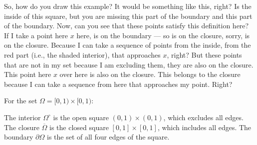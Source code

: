 \begin{spoken-clean}[00:05:33 - 00:07:55]
So, how do you draw this example? It would be something like this, right?  Is the inside of this square, but you are missing this part of the boundary and this part of the boundary. Now, can you see that these points satisfy this definition here? If I take a point here $x$ here, is on the boundary --- so is on the closure, sorry, is on the closure. Because I can take a sequence of points from the inside, from the red part (i.e., the shaded interior), that approaches $x$, right? But these points that are not in my set because I am excluding them, they are also on the closure. This point here $x$ over here is also on the closure. This belongs to the closure because I can take a sequence from here that approaches my point. Right?
\end{spoken-clean}

\begin{math-stroke}
For the set $\Omega = [0, 1) \times [0, 1)$:
\begin{center}
\end{center}
\begin{explanation-of-steps}
The interior $\Omega^\circ$ is the open square $(0, 1) \times (0, 1)$, which excludes all edges. The closure $\overline{\Omega}$ is the closed square $[0, 1] \times [0, 1]$, which includes all edges. The boundary $\partial \Omega$ is the set of all four edges of the square.
\end{explanation-of-steps}
\end{math-stroke}


